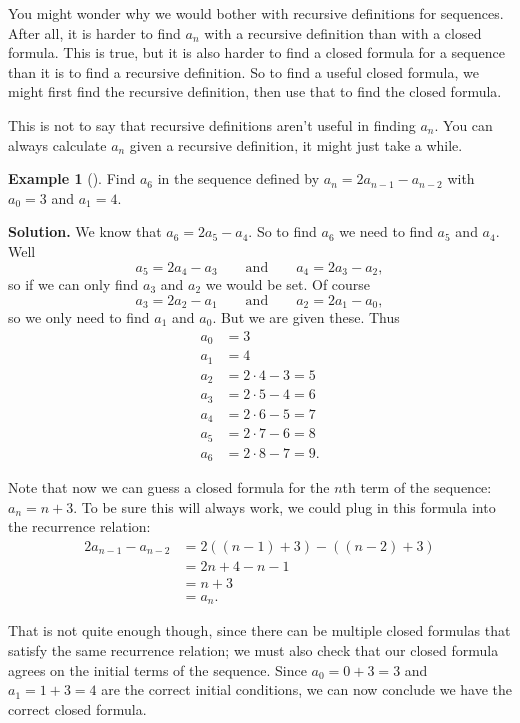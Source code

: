 \documentclass[10pt,]{book}
\theoremstyle{plain}
\theoremstyle{definition}
\theoremstyle{definition}
\newtheorem{example}[theorem]{Example}
\theoremstyle{definition}
\theoremstyle{definition}
\numberwithin{equation}{chapter}
\newcommand{\amp}{&}
\begin{document}
\hypertarget{p-55}{}%
You might wonder why we would bother with recursive definitions for sequences. After all, it is harder to find \(a_n\) with a recursive definition than with a closed formula. This is true, but it is also harder to find a closed formula for a sequence than it is to find a recursive definition. So to find a useful closed formula, we might first find the recursive definition, then use that to find the closed formula.%
\par
\hypertarget{p-56}{}%
This is not to say that recursive definitions aren't useful in finding \(a_n\). You can always calculate \(a_n\) given a recursive definition, it might just take a while.%
\begin{example}[]\label{example-3}
\hypertarget{p-57}{}%
Find \(a_6\) in the sequence defined by \(a_n = 2a_{n-1} - a_{n-2}\) with \(a_0 = 3\) and \(a_1 = 4\).%
\par\smallskip%
\noindent\textbf{Solution.}\hypertarget{solution-2}{}\quad%
\hypertarget{p-58}{}%
We know that \(a_6 = 2a_5 - a_4\). So to find \(a_6\) we need to find \(a_5\) and \(a_4\). Well%
\begin{equation*}
a_5 = 2a_4 - a_3 \qquad \text{and} \qquad a_4 = 2a_3 - a_2,
\end{equation*}
so if we can only find \(a_3\) and \(a_2\) we would be set. Of course%
\begin{equation*}
a_3 = 2a_2 - a_1 \qquad \text{and} \qquad a_2 = 2a_1 - a_0,
\end{equation*}
so we only need to find \(a_1\) and \(a_0\). But we are given these. Thus%
\begin{align*}
a_0 \amp = 3\\
a_1 \amp = 4\\
a_2 \amp = 2\cdot 4 - 3 = 5\\
a_3 \amp = 2\cdot 5 - 4 = 6\\
a_4 \amp = 2\cdot 6 - 5 = 7\\
a_5 \amp = 2\cdot 7 - 6 = 8\\
a_6 \amp = 2\cdot 8 - 7 = 9.
\end{align*}
%
\par
\hypertarget{p-59}{}%
Note that now we can guess a closed formula for the \(n\)th term of the sequence: \(a_n = n+3\). To be sure this will always work, we could plug in this formula into the recurrence relation:%
\begin{align*}
2a_{n-1} - a_{n-2} \amp = 2((n-1) + 3) - ((n-2) + 3)\\
\amp = 2n + 4 - n - 1 \\
\amp = n + 3\\
\amp = a_n.
\end{align*}
%
\par
\hypertarget{p-60}{}%
That is not quite enough though, since there can be multiple closed formulas that satisfy the same recurrence relation; we must also check that our closed formula agrees on the initial terms of the sequence.  Since \(a_0 = 0 + 3 = 3\) and \(a_1 = 1+3 = 4\) are the correct initial conditions, we can now conclude we have the correct closed formula.%
\end{example}
\end{document}
